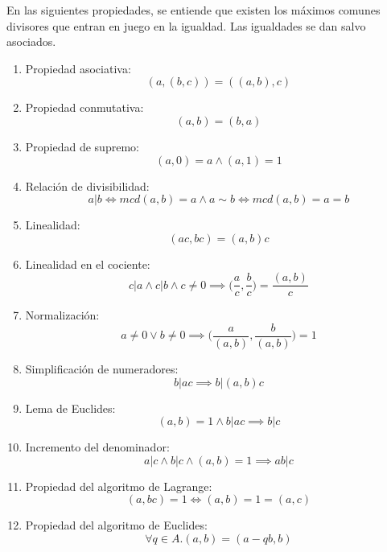 \begin{proposition}
	En las siguientes propiedades, se entiende que existen los máximos comunes divisores que entran en juego en la igualdad. Las igualdades se dan salvo asociados. 
	
	\begin{enumerate}
	\item Propiedad asociativa: $$(a,(b,c)) = ((a,b),c)$$
	\item Propiedad conmutativa: $$(a,b) = (b,a)$$
	\item Propiedad de supremo: $$(a,0) = a \land (a,1) = 1$$
	\item Relación de divisibilidad: $$a|b \iff mcd(a,b) = a \land a \sim b \iff mcd(a,b) = a = b$$
	\item Linealidad: $$(ac,bc) = (a,b)c$$
	\item Linealidad en el cociente: $$c|a \land c|b \land c \neq 0 \implies \Big(\frac{a}{c},\frac{b}{c}\Big) = \frac{(a,b)}{c}$$
	\item Normalización: $$ a \neq 0 \lor b \neq 0 \implies \Big(\frac{a}{(a,b)},\frac{b}{(a,b)}\Big) = 1$$
	\item Simplificación de numeradores: $$b|ac \implies b|(a,b)c$$
	\item Lema de Euclides: $$(a,b) = 1 \land b|ac \implies b|c$$
	\item Incremento del denominador: $$a|c \land b|c \land (a,b) = 1 \implies ab|c$$
	\item Propiedad del algoritmo de Lagrange: $$(a,bc) = 1 \iff (a,b) = 1 = (a,c)$$
	\item Propiedad del algoritmo de Euclides: $$\forall q \in A.(a,b) = (a-qb,b)$$
	\end{enumerate}
\end{proposition}
